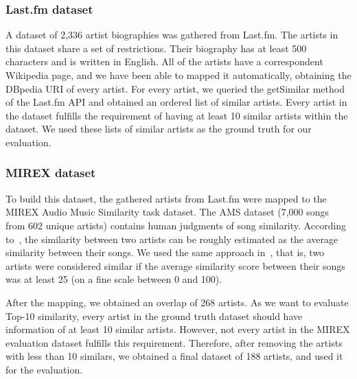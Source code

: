 
\subsubsection{Last.fm dataset}\label{sec:similarity:lastfm_dataset}

A dataset of 2,336 artist biographies was gathered from Last.fm. The artists in this dataset share a set of restrictions.
Their biography has at least 500 characters and is written in English.
All of the artists have a correspondent Wikipedia page, and we have been able to mapped it automatically, obtaining the DBpedia URI of every artist.
For every artist, we queried the getSimilar method of the Last.fm API and obtained an ordered list of similar artists. Every artist in the dataset fulfills the requirement of having at least 10 similar artists within the dataset.
We used these lists of similar artists as the ground truth for our evaluation.

\subsubsection{MIREX dataset} %

To build this dataset, the gathered artists from Last.fm
were mapped to the MIREX Audio Music Similarity task dataset. The AMS dataset (7,000 songs from 602 unique artists) contains human judgments of song similarity. According to~\cite{Schedl2013}, the similarity between two artists can be roughly estimated as the average similarity between their songs. We used the same approach in~\cite{Schedl2013}, that is, two artists were considered similar if the average similarity score between their songs was at least 25 (on a fine scale between 0 and 100).

After the mapping, we obtained an overlap of 268 artists.
As we want to evaluate Top-10 similarity, every artist in the ground truth dataset should have information of at least 10 similar artists. However, not every artist in the MIREX evaluation dataset fulfills this requirement. Therefore, after removing the artists with less than 10 similars, we obtained a final dataset of 188 artists, and used it for the evaluation.

